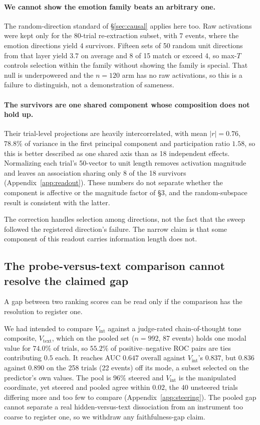 \documentclass{article}
\begin{document}
\paragraph{We cannot show the emotion family beats an arbitrary one.}
The random-direction standard of \S\ref{sec:causal} applies here too. Raw
activations were kept only for the 80-trial re-extraction subset, with 7 events,
where the emotion directions yield 4 survivors. Fifteen sets of 50 random unit
directions from that layer yield $3.7$ on average and 8 of 15 match or exceed 4, so max-$T$ controls selection within the family without showing the family is
special. That null is underpowered and the $n=120$ arm has no raw activations, so
this is a failure to distinguish, not a demonstration of sameness.
\paragraph{The survivors are one shared component whose composition does not hold
up.} Their trial-level projections are heavily intercorrelated, with mean $|r| = 0.76$,
$78.8\%$ of variance in the first principal component and participation ratio $1.58$,
so this is better described as one shared axis than as 18 independent effects. Normalizing each trial's 50-vector to unit length removes activation magnitude and
leaves an association sharing only 8 of the 18 survivors
(Appendix~\ref{app:readout}). These numbers do not separate whether the component
is affective or the magnitude factor of \S3, and the random-subspace result is
consistent with the latter.

The correction handles selection among directions, not the fact that the sweep
followed the registered direction's failure. The narrow claim is that some
component of this readout carries information length does not.

\subsection{The probe-versus-text comparison cannot resolve the claimed gap}
\label{sec:vtext}

A gap between two ranking scores can be read only if the comparison has the
resolution to register one.

We had intended to compare $V_{\text{int}}$ against a judge-rated chain-of-thought
tone composite, $V_{\text{text}}$, which on the pooled set ($n = 992$, 87 events)
holds one modal value for $74.0\%$ of trials, so
$\mathbf{55.2\%}$ of positive--negative ROC pairs are ties contributing $0.5$
each. It reaches AUC $0.647$ overall against $V_{\text{int}}$'s $0.837$, but
$\mathbf{0.836}$ against $0.890$ on the 258 trials (22 events) off its mode, a
subset selected on the predictor's own values. The pool is $96\%$ steered and $V_{\text{int}}$ is the manipulated coordinate, yet
steered and pooled agree within $0.02$, the 40 unsteered trials differing more and
too few to compare (Appendix~\ref{app:steering}). The pooled gap cannot
separate a real hidden-versus-text dissociation from an instrument too coarse to
register one, so we withdraw any faithfulness-gap claim. 
\end{document}
